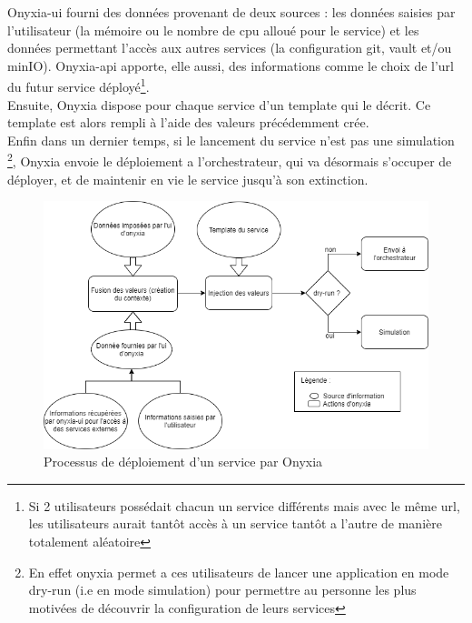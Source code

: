 \documentclass[11pt,fleqn]{book} %
\begin{document}
Onyxia-ui fourni des données provenant de deux sources : les données saisies par l'utilisateur (la mémoire ou le nombre de cpu alloué pour le service) et les données permettant l'accès aux autres services (la configuration git, vault et/ou minIO). Onyxia-api apporte, elle aussi, des informations comme le choix de l'url du futur service déployé\footnote{Si 2 utilisateurs possédait chacun un service différents mais avec le même url, les utilisateurs aurait tantôt accès à un service tantôt a l'autre de manière totalement aléatoire}.\\

Ensuite, Onyxia dispose pour chaque service d'un template qui le décrit. Ce template est alors rempli à l'aide des valeurs précédemment crée.\\

Enfin dans un dernier temps, si le lancement du service n'est pas une simulation \footnote{En effet onyxia permet a ces utilisateurs de lancer une application en mode dry-run (i.e en mode simulation) pour permettre au personne les plus motivées de découvrir la configuration de leurs services}, Onyxia envoie le déploiement a l'orchestrateur, qui va désormais s'occuper de déployer, et de maintenir en vie le service jusqu'à son extinction.

\begin{figure}[H]
\renewcommand{\figurename}{Diagramme}
\hspace{-1cm}
\includegraphics[scale=0.7]{Pictures/onyxia/onyxia-simplification.png}
\captionsetup{margin=1.5cm,format=hang,justification=justified}
\caption[]{Processus de déploiement d'un service par Onyxia \newline}
\end{figure}
\end{document}
